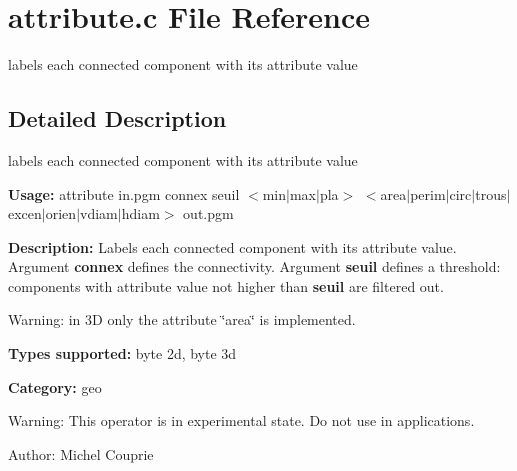 \section{attribute.c File Reference}
\label{attribute_8c}
labels each connected component with its attribute value  




\label{_details}
\subsection{Detailed Description}
labels each connected component with its attribute value 

{\bf Usage:} attribute in.pgm connex seuil $<$min$|$max$|$pla$>$ $<$area$|$perim$|$circ$|$trous$|$excen$|$orien$|$vdiam$|$hdiam$>$ out.pgm

{\bf Description:} Labels each connected component with its attribute value. Argument {\bf connex} defines the connectivity. Argument {\bf seuil} defines a threshold: components with attribute value not higher than {\bf seuil} are filtered out.

Warning: in 3D only the attribute \char`\"{}area\char`\"{} is implemented.

{\bf Types supported:} byte 2d, byte 3d

{\bf Category:} geo

\begin{Desc}
\item[Warning:]This operator is in experimental state. Do not use in applications.\end{Desc}
\begin{Desc}
\item[Author:]Michel Couprie \end{Desc}
